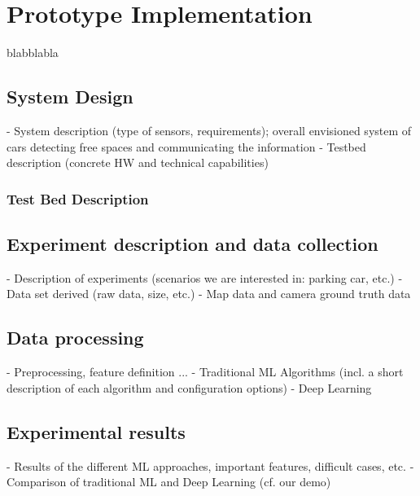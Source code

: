 \chapter{Prototype Implementation}
\label{chap:referenceimplementation}

blabblabla

\section{System Design}
\label{sec:system_design}
- System description (type of sensors, requirements); overall envisioned system of
cars detecting free spaces and communicating the information
- Testbed description (concrete HW and technical capabilities)

\subsection{Test Bed Description}
\label{sec:test_bed}

\section{Experiment description and data collection}
\label{sec:experiment_description_data_collection}
- Description of experiments (scenarios we are interested in: parking car, etc.)
- Data set derived (raw data, size, etc.)
- Map data and camera ground truth data

\section{Data processing}
\label{sec:data_processing}
- Preprocessing, feature definition ...
- Traditional ML Algorithms (incl. a short description of each algorithm and configuration options)
- Deep Learning

\section{Experimental results}
- Results of the different ML approaches, important features, difficult cases, etc.
- Comparison of traditional ML and Deep Learning (cf. our demo)